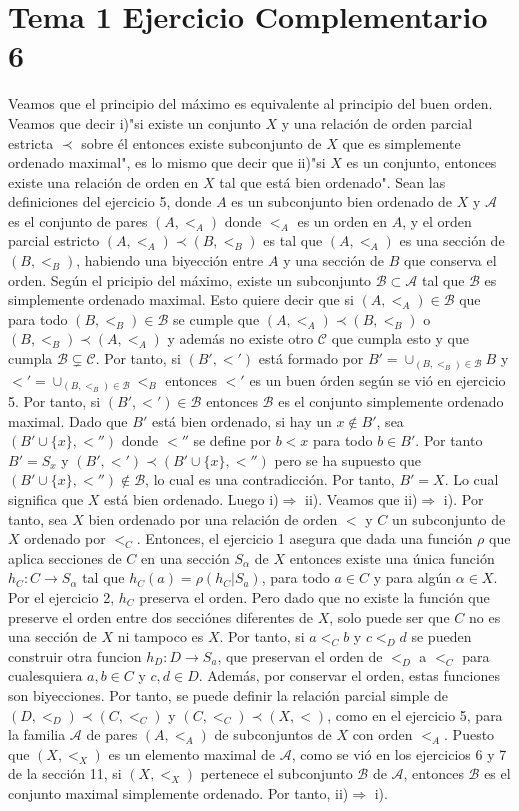 \documentclass{article}
\begin{document}
\section{Tema 1 Ejercicio Complementario 6}
Veamos que el principio del máximo es equivalente al principio del buen orden. Veamos que decir i)"si existe un conjunto $X$ y una relación de orden parcial estricta $\prec$ sobre él entonces existe subconjunto de $X$ que es simplemente ordenado maximal", es lo mismo que decir que ii)"si $X$ es un conjunto, entonces existe una relación de orden en $X$ tal que está bien ordenado". Sean las definiciones del ejercicio 5, donde $A$ es un subconjunto bien ordenado de $X$ y $\mathcal{A}$ es el conjunto de pares $(A,<_A)$ donde $<_A$ es un orden en $A$, y el orden parcial estricto  $(A,<_A)\prec (B,<_B)$ es tal que $(A,<_A)$ es una sección de $(B,<_B)$, habiendo una biyección entre $A$ y una sección de $B$ que conserva el orden. Según el pricipio del máximo, existe un subconjunto $\mathcal{B}\subset \mathcal{A}$ tal que $\mathcal{B}$ es simplemente ordenado maximal. Esto quiere decir que si $(A,<_A)\in \mathcal{B}$ que para todo $(B,<_B)\in \mathcal{B}$ se cumple que $(A,<_A)\prec (B,<_B)$ o $(B,<_B)\prec (A,<_A)$ y además no existe otro $\mathcal{C}$ que cumpla esto y que cumpla $\mathcal{B}\subsetneq \mathcal{C}$. Por tanto, si $(B',<')$ está formado por $B'=\cup_{(B,<_B)\in \mathcal{B}}B$ y $<'=\cup_{(B,<_B)\in \mathcal{B}}<_B$ entonces $<'$ es un buen órden según se vió en ejercicio 5. Por tanto, si $(B', <')\in \mathcal{B}$ entonces $\mathcal{B}$ es el conjunto simplemente ordenado maximal. Dado que $B'$ está bien ordenado, si hay un $x\notin B'$, sea $(B'\cup \{x\},<'')$ donde $<''$ se define por $b<x$ para todo $b\in B'$. Por tanto $B'= S_x$ y $(B',<')\prec (B'\cup \{x\},<'')$ pero se ha supuesto que $(B'\cup \{x\}, <'')\notin \mathcal{B}$, lo cual es una contradicción. Por tanto, $B'=X$. Lo cual significa que $X$ está bien ordenado. Luego i)$\Rightarrow$ ii). Veamos que ii)$\Rightarrow$ i). Por tanto, sea $X$ bien ordenado por una relación de orden $<$ y $C$ un subconjunto de $X$ ordenado por $<_C$. Entonces, el ejercicio 1 asegura que dada una función $\rho$ que aplica secciones de $C$ en una sección $S_\alpha$ de $X$ entonces existe una única función $h_C:C\rightarrow S_\alpha$ tal que $h_C(a)= \rho(h_C|S_a)$, para todo $a\in C$ y para algún $\alpha\in X$. Por el ejercicio 2, $h_C$ preserva el orden. Pero dado que no existe la función que preserve el orden entre dos secciónes diferentes de $X$, solo puede ser que $C$ no es una sección de $X$ ni tampoco es $X$. Por tanto, si $a<_C b$ y $c<_D d$ se pueden construir otra  funcion $h_D: D \rightarrow S_a$, que preservan el orden de $<_D$ a $<_C$ para cualesquiera $a,b \in C$ y  $c,d \in D$. Además, por conservar el orden, estas funciones son biyecciones. Por tanto, se puede definir la relación parcial simple de $(D,<_D)\prec (C,<_C)$ y $(C,<_C)\prec (X,<)$, como en el ejercicio 5, para la familia $\mathcal{A}$ de pares $(A,<_A)$ de subconjuntos de $X$ con orden $<_A$. Puesto que $(X,<_X)$ es un elemento maximal de $\mathcal{A}$, como se vió en los ejercicios 6 y 7 de la sección 11, si $(X,<_X)$ pertenece el subconjunto $\mathcal{B}$ de $\mathcal{A}$, entonces $\mathcal{B}$ es el conjunto maximal simplemente ordenado. Por tanto, ii)$\Rightarrow$ i).
\end{document}
